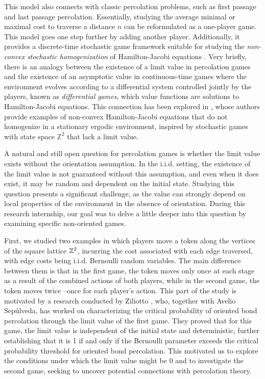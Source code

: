 	This model also connects with classic percolation problems, such as first passage and last passage percolation. Essentially, studying the average minimal or maximal cost to traverse a distance $n$ can be reformulated as a one-player game. This model goes one step further by adding another player. Additionally, it provides a discrete-time stochastic game framework \cite[Section 4]{GarnierZiliotto2022} suitable for studying the \textit{non-convex stochastic homogenization} of Hamilton-Jacobi equations \cite{LionsPapanicolaouVaradhan1987}. Very briefly, there is an analogy between the existence of a limit value in percolation games and the existence of an asymptotic value in continuous-time games where the environment evolves according to a differential system controlled jointly by the players, known as \textit{differential games}, which value functions are solutions to Hamilton-Jacobi equations. This connection has been explored in \cite{Ziliotto2016, FeldmanFermanianZiliotto2021}, whose authors provide examples of non-convex Hamilton-Jacobi equations that do not homogenize in a stationary ergodic environment, inspired by stochastic games with state space $\mathbb{Z}^2$ that lack a limit value.

	A natural and still open question for percolation games is whether the limit value exists without the orientation assumption. In the i.i.d. setting, the existence of the limit value is not guaranteed without this assumption, and even when it does exist, it may be random and dependent on the initial state. Studying this question presents a significant challenge, as the value can strongly depend on local properties of the environment in the absence of orientation. During this research internship, our goal was to delve a little deeper into this question by examining specific non-oriented games.
	
	First, we studied two examples in which players move a token along the vertices of the square lattice $\mathbb{Z}^2$, incurring the cost associated with each edge traversed, with edge costs being i.i.d. Bernoulli random variables. The main difference between them is that in the first game, the token moves only once at each stage as a result of the combined actions of both players, while in the second game, the token moves twice --once for each player's action. 
	This part of the study is motivated by a research conducted by Ziliotto \cite{Ziliotto2023}, who, together with Avelio Sepúlveda, has worked on characterizing the critical probability of oriented bond percolation through the limit value of the first game. They proved that for this game, the limit value is independent of the initial state and deterministic, further establishing that it is 1 if and only if the Bernoulli parameter exceeds the critical probability threshold for oriented bond percolation. This motivated us to explore the conditions under which the limit value might be 0 and to investigate the second game, seeking to uncover potential connections with percolation theory.

